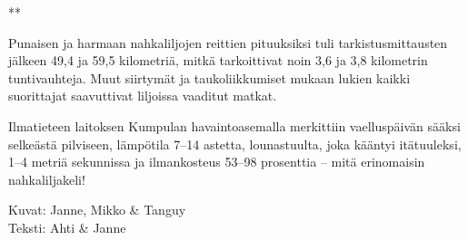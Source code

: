 \begin{multicols}{2}
{\smallskip\noindent\centering ***\par\smallskip}

Punaisen ja harmaan nahkaliljojen reittien pituuksiksi tuli tarkistusmittausten 
jälkeen 49,4 ja 59,5 kilometriä, mitkä tarkoittivat noin 3,6 ja 3,8 
kilometrin tuntivauhteja. Muut siirtymät ja taukoliikkumiset mukaan lukien 
kaikki suorittajat saavuttivat liljoissa vaaditut matkat. 

Ilmatieteen laitoksen Kumpulan havaintoasemalla merkittiin vaelluspäivän 
sääksi selkeästä pilviseen, lämpötila 7--14 astetta, lounastuulta, joka 
kääntyi itätuuleksi, 1--4 metriä sekunnissa ja ilmankosteus 53--98 
prosenttia -- mitä erinomaisin nahkaliljakeli!

\bigskip

\noindent\null\hfill Kuvat: Janne, Mikko \& Tanguy\\
\noindent\null\hfill Teksti: Ahti \& Janne

\end{multicols}
